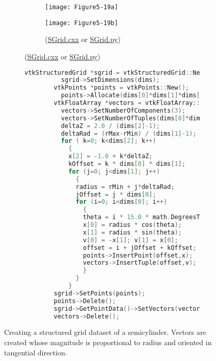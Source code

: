 \begin{description}[leftmargin=0cm,labelindent=0cm]
\begin{figure}[!htb]
    \centering
    \begin{subfigure}[h]{0.80\linewidth}
    	\begin{subfigure}[h]{0.40\linewidth}
    		\texttt{[image: Figure5-19a]}
    		\caption*{}
    		\label{fig:Figure5-19a}
    	\end{subfigure}
    	\hfill
    	\begin{subfigure}[h]{0.40\linewidth}
    		\texttt{[image: Figure5-19b]}
    		\caption*{(\href{https://lorensen.github.io/VTKExamples/site/Cxx/StructuredGrid/SGrid/}{SGrid.cxx} or \href{https://lorensen.github.io/VTKExamples/site/Python/StructuredGrid/SGrid/}{SGrid.py})}
    		\label{fig:Figure5-19b}
    	\end{subfigure}
	\end{subfigure}
	\hfill
	\begin{subfigure}[h]{0.96\linewidth}
		\begin{lstlisting}[language=C++, caption={}]
		vtkStructuredGrid *sgrid = vtkStructuredGrid::New();
		  sgrid->SetDimensions(dims);
		vtkPoints *points = vtkPoints::New();
		  points->Allocate(dims[0]*dims[1]*dims[2]);
		vtkFloatArray *vectors = vtkFloatArray::New();
		  vectors->SetNumberOfComponents(3);
		  vectors->SetNumberOfTuples(dims[0]*dims[1]*dims[2]);
		  deltaZ = 2.0 / (dims[2]-1);
		  deltaRad = (rMax-rMin) / (dims[1]-1); v[2]=0.0;
		  for ( k=0; k<dims[2]; k++)
		    {
		    x[2] = -1.0 + k*deltaZ;
		    kOffset = k * dims[0] * dims[1];
		    for (j=0; j<dims[1]; j++)
		      {
		      radius = rMin + j*deltaRad;
		      jOffset = j * dims[0];
		      for (i=0; i<dims[0]; i++)
		        {
		        theta = i * 15.0 * math.DegreesToRadians();
		        x[0] = radius * cos(theta);
		        x[1] = radius * sin(theta);
		        v[0] = -x[1]; v[1] = x[0];
		        offset = i + jOffset + kOffset;
		        points->InsertPoint(offset,x);
		        vectors->InsertTuple(offset,v);
		        }
		      }
		    }
		sgrid->SetPoints(points);
		points->Delete();
		sgrid->GetPointData()->SetVectors(vectors);
		vectors->Delete();
		\end{lstlisting}
		\caption*{}
		\label{fig:Figure5-19c}
	\end{subfigure}
	\caption{Creating a structured grid dataset of a semicylinder. Vectors are created whose magnitude is proportional to radius and oriented in tangential direction.}\label{fig:Figure5-19}
\end{figure}


\end{description}
